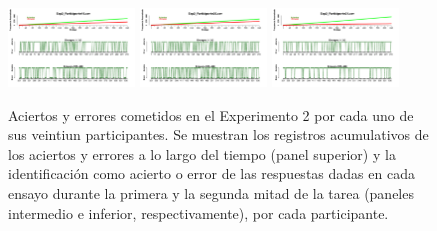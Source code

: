 \begin{figure}[th]
\includegraphics[width=0.30\textwidth]{Figures/Success_Exp2_P19} \includegraphics[width=0.30\textwidth]{Figures/Success_Exp2_P20} \includegraphics[width=0.30\textwidth]{Figures/Success_Exp2_P21} 
\caption[Aciertos y Errores a lo largo del tiempo; Experimento 2]{Aciertos y errores cometidos en el Experimento 2 por cada uno de sus veintiun participantes. Se muestran los registros acumulativos de los aciertos y errores a lo largo del tiempo (panel superior) y la identificación como acierto o error de las respuestas dadas en cada ensayo durante la primera y la segunda mitad de la tarea (paneles intermedio e inferior, respectivamente), por cada participante.}
\label{fig:Success_E2}
\end{figure}


